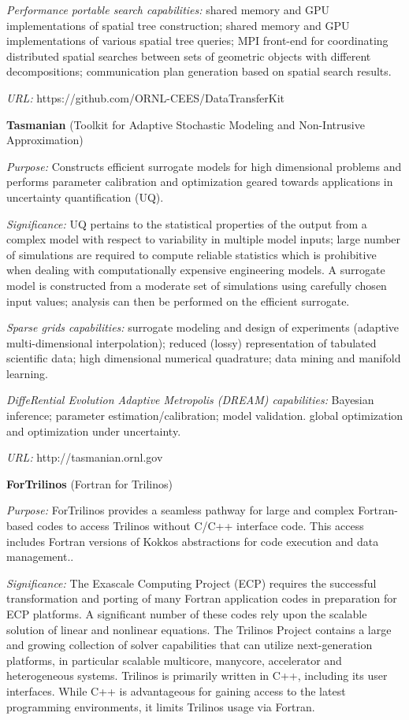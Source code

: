 {\it Performance portable search capabilities:} shared memory and GPU
implementations of spatial tree construction; shared memory and GPU
implementations of various spatial tree queries; MPI front-end for
coordinating distributed spatial searches between sets of geometric objects
with different decompositions; communication plan generation based on spatial
search results.

{\it URL:} https://github.com/ORNL-CEES/DataTransferKit


{\bf Tasmanian} (Toolkit for Adaptive Stochastic Modeling and Non-Intrusive
Approximation)

{\it Purpose:} Constructs efficient surrogate models for high dimensional
problems and performs parameter calibration and optimization geared towards
applications in uncertainty quantification (UQ).

{\it Significance:} UQ pertains to the statistical properties of the output
from a complex model with respect to variability in multiple model inputs;
large number of simulations are required to compute reliable statistics which
is prohibitive when dealing with computationally expensive engineering
models. A surrogate model is constructed from a moderate set of simulations
using carefully chosen input values; analysis can then be performed on the
efficient surrogate.

{\it Sparse grids capabilities:} surrogate modeling and design of experiments
(adaptive multi-dimensional interpolation); reduced (lossy) representation of
tabulated scientific data; high dimensional numerical quadrature; data mining
and manifold learning.

{\it DiffeRential Evolution Adaptive Metropolis (DREAM) capabilities:}
Bayesian inference; parameter estimation/calibration; model validation.
global optimization and optimization under uncertainty.

{\it URL:} http://tasmanian.ornl.gov


{\bf ForTrilinos} (Fortran for Trilinos)

{\it Purpose:} ForTrilinos provides a seamless pathway for large and complex
Fortran-based codes to access Trilinos without C/C++ interface code.
This access includes Fortran versions of Kokkos abstractions for code
execution and data management..

{\it Significance:} The Exascale Computing Project (ECP) requires the successful
transformation and porting of many Fortran application codes in preparation for
ECP platforms. A significant number of these codes rely upon the scalable
solution of linear and nonlinear equations. The Trilinos Project contains
a large and growing collection of solver capabilities that can utilize
next-generation platforms, in particular scalable multicore, manycore,
accelerator and heterogeneous systems. Trilinos is primarily written in C++,
including its user interfaces. While C++ is advantageous for gaining access to
the latest programming environments, it limits Trilinos usage via Fortran.

